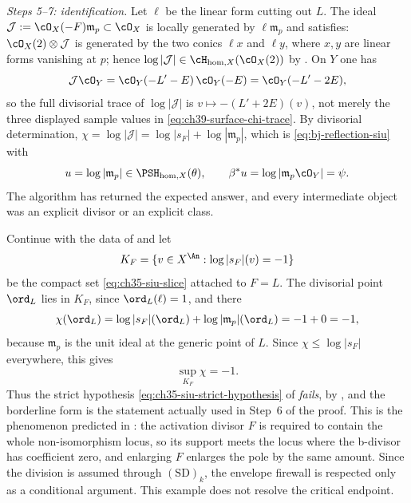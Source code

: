 \begin{example}
\emph{Steps 5--7: identification.}  Let $\ell$ be the linear form cutting
out $L$.  The ideal $\mathcal J:=\cO_X(-F)\mathfrak m_p\subset\cO_X$
is locally generated by $\ell\mathfrak m_p$ and satisfies:
$\cO_X(2)\otimes\mathcal J$ is generated by the two conics
$\ell x$ and $\ell y$, where $x,y$ are linear forms vanishing at
$p$; hence $\log|\mathcal J|\in\cH_{\mathrm{hom},X}(\cO_X(2))$ by
.  On $Y$ one has
\[
 \mathcal J\cO_Y
 =\cO_Y(-L'-E)\,\cO_Y(-E)
 =\cO_Y(-L'-2E),
\]
so the full divisorial trace of $\log|\mathcal J|$ is
$v\mapsto-(L'+2E)(v)$, not merely the three displayed sample values in
\eqref{eq:ch39-surface-chi-trace}.  By divisorial determination,
$\chi=\log|\mathcal J|=\log|s_F|+\log|\mathfrak m_p|$, which is
\eqref{eq:bj-reflection-siu} with
\[
 u=\log|\mathfrak m_p|\in\PSH_{\mathrm{hom},X}(\theta),
 \qquad
 \beta^*u=\log|\mathfrak m_p\cO_Y|=\psi .
\]
The algorithm has returned the expected answer, and every intermediate
object was an explicit divisor or an explicit class.
\end{example}

\begin{example}
\label{ex:ch39-reflection-borderline}
Continue with the data of  and let
\[
 K_F=\{v\in X^{\An}:\log|s_F|(v)=-1\}
\]
be the compact set \eqref{eq:ch35-siu-slice} attached to $F=L$.  The
divisorial point $\ord_L$ lies in $K_F$, since
$\ord_L(\ell)=1$, and there
\[
 \chi(\ord_L)=\log|s_F|(\ord_L)+\log|\mathfrak m_p|(\ord_L)=-1+0=-1 ,
\]
because $\mathfrak m_p$ is the unit ideal at the generic point of $L$.
Since $\chi\le\log|s_F|$ everywhere, this gives
\[
 \sup_{K_F}\chi=-1 .
\]
Thus the strict hypothesis \eqref{eq:ch35-siu-strict-hypothesis} of
 \emph{fails}, by
, and the borderline form
 is the statement actually used in
Step~6 of the proof.  This is the phenomenon predicted in
: the activation divisor $F$ is required
to contain the whole non-isomorphism locus, so its support meets the locus
where the b-divisor has coefficient zero, and enlarging $F$ enlarges the
pole by the same amount.  Since
the division is assumed through $\mathrm{(SD)}_k$, the envelope firewall
is respected only as a conditional argument. This example does not
resolve the critical endpoint.
\end{example}

